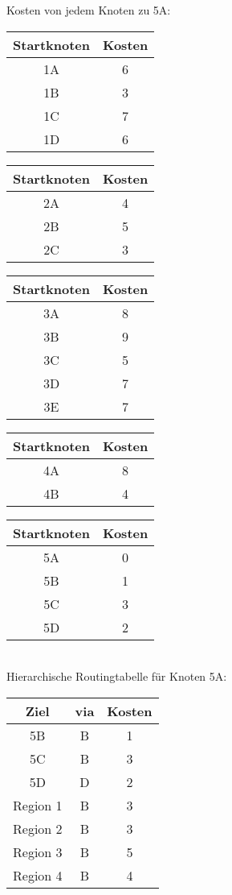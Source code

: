 \documentclass[a4paper,
			llpt,
			solution,
			accentcolor=tud2d,
			colorbacktitle
			]
			{tudexercise}
\newcommand{\8}{$\infty$}
\begin{document}
Kosten von jedem Knoten zu 5A: \\
\begin{multicols}{3}
\begin{tabular}{c|c}
Startknoten & Kosten \\ \hline
1A & 6\\
1B & 3\\
1C & 7\\
1D & 6\\
\end{tabular}
\vfill
\columnbreak
\begin{tabular}{c|c}
Startknoten & Kosten \\ \hline
2A & 4\\
2B & 5\\
2C & 3\\
\end{tabular}
\vfill
\columnbreak
\begin{tabular}{c|c}
Startknoten & Kosten \\ \hline
3A & 8\\
3B & 9\\
3C & 5\\
3D & 7\\
3E & 7\\
\end{tabular}
\end{multicols}
\begin{multicols}{3}
\begin{tabular}{c|c}
Startknoten & Kosten \\ \hline
4A & 8\\
4B & 4\\
\end{tabular}
\vfill
\columnbreak
\begin{tabular}{c|c}
Startknoten & Kosten \\ \hline
5A & 0\\
5B & 1\\
5C & 3\\
5D & 2\\
\end{tabular}
\end{multicols}
~\\
Hierarchische Routingtabelle für Knoten 5A: \\
\begin{tabular}{c|c|c}
Ziel  &   via  &   Kosten \\ \hline
5B       &B    &    1 \\
5C       &B    &    3\\
5D       &D    &    2\\
Region 1 &B    &    3\\
Region 2 &B    &    3\\
Region 3 &B    &    5\\
Region 4 &B    &    4\\
\end{tabular}
\end{document}
